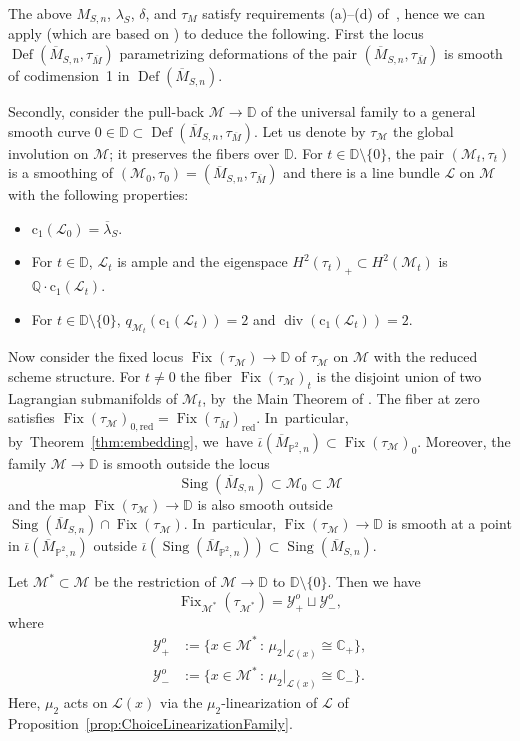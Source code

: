\documentclass[JEP,XML,SOM,Unicode,published]{cedram}
\newcommand{\CC}{{\mathbb C}}\let\C\CC
\newcommand{\DD}{{\mathbb D}}
\newcommand{\PP}{{\mathbb P}}\let\P\PP
\newcommand{\QQ}{{\mathbb Q}}\let\Q\QQ
\newcommand\cL{\mathcal{L}}
\newcommand\cM{\mathcal{M}}
\newcommand\cY{\mathcal{Y}}
\DeclareMathOperator{\Def}{Def}
\DeclareMathOperator{\divisore}{div}\let\div\divisore
\DeclareMathOperator{\Fix}{Fix}
\DeclareMathOperator{\Sing}{Sing}
\theoremstyle{definition}
\begin{document}
The above $M_{S,n}$, $\lambda_S$, $\delta$, and $\tau_M$ satisfy requirements (a)--(d) of~\cite[\S 2]{involutions1}, hence we can apply \cite[Prop.\,2.1 \& Cor.\,2.2]{involutions1} (which are based on \cite{Namikawa:Def, markman:modular}) to deduce the following.
First the locus $\Def(\overline{M}_{S,n},\tau_{\overline{M}})$ parametrizing deformations of the pair $(\overline{M}_{S,n},\tau_{\overline{M}})$ is smooth of codimension~1 in $\Def(\overline{M}_{S,n})$.

Secondly, consider the pull-back $\mathcal{M}\to \DD$ of the universal family to a general smooth curve $0\in \DD\subset \Def(\overline{M}_{S,n},\tau_{\overline{M}})$.
Let us denote by $\tau_{\mathcal{M}}$ the global involution on $\mathcal{M}$; it preserves the fibers over $\DD$.
For $t\in \DD\setminus\{0\}$, the pair $(\mathcal{M}_t, \tau_t)$ is a smoothing of $(\mathcal{M}_0, \tau_0)=(\overline{M}_{S,n},\tau_{\overline{M}})$ and there is a line bundle $\cL$ on $\mathcal{M}$ with the following properties:
\begin{itemize}
\item $\mathrm{c}_1(\cL_0)=\overline{\lambda}{}_S$.
\item For $t\in \DD$, $\cL_t$ is ample and the eigenspace $H^2(\tau_t)_{+}\subset H^2(\mathcal{M}_t)$ is $\QQ\cdot \mathrm{c}_1(\cL_t)$.
\item For $t\in \DD\setminus\{0\}$, $q_{\cM_t}(\mathrm{c}_1(\cL_t))=2$ and $\divisore(\mathrm{c}_1(\cL_t))=2$.
\end{itemize}

Now consider the fixed locus $\Fix(\tau_{\cM})\to \DD$ of $\tau_{\cM}$ on $\cM$ with the reduced scheme structure.
For $t\ne0$ the fiber $\Fix(\tau_{\mathcal M})_t$ is the disjoint union of two Lagrangian submanifolds of $\cM_t$, by~the Main Theorem of \cite{involutions1}.
The fiber at zero satisfies $\Fix(\tau_{\mathcal M})_{0,\mathrm{red}}=\Fix(\tau_{\overline{M}})_{\mathrm{red}}$. In~particular, by~Theorem~\ref{thm:embedding}, we~have $\overline{\iota}(\overline{M}_{\PP^2,n})\subset \Fix(\tau_{\mathcal M})_0$.
Moreover, the family $\cM\to \DD$ is smooth outside the locus
\[
\Sing(\overline{M}_{S,n})\subset \cM_0 \subset \cM
\]
and the map $\Fix(\tau_{\cM})\to \DD$ is also smooth outside $\Sing(\overline{M}_{S,n})\cap \Fix(\tau_{\cM})$. In~particular, $\Fix(\tau_{\cM})\to \DD$ is smooth at a point in $\overline{\iota}(\overline{M}_{\PP^2,n})$ outside $\overline{\iota}(\Sing(\overline{M}_{\PP^2,n}))\subset \Sing(\overline{M}_{S,n})$.

Let $\cM^{*}\subset\cM$ be the restriction of $\cM\to\DD$ to $\DD\setminus\{0\}$.
Then we have
\[
\Fix_{\cM^{*}}(\tau_{\cM^{*}})= \cY^o_+ \sqcup \cY^o_-,
\]
where
\begin{equation*}
\begin{split}
\cY^o_+ &:=\{ x\in \cM^* \,:\, \mu_2|_{\cL(x)} \cong \CC_{+}\}, \\
\cY^o_- &:=\{ x\in \cM^* \,:\, \mu_2|_{\cL(x)} \cong \CC_{-}\}.
\end{split}
\end{equation*}
Here, $\mu_2$ acts on $\cL(x)$ via the $\mu_2$-linearization of $\cL$ of Proposition~\ref{prop:ChoiceLinearizationFamily}.
\end{document}
